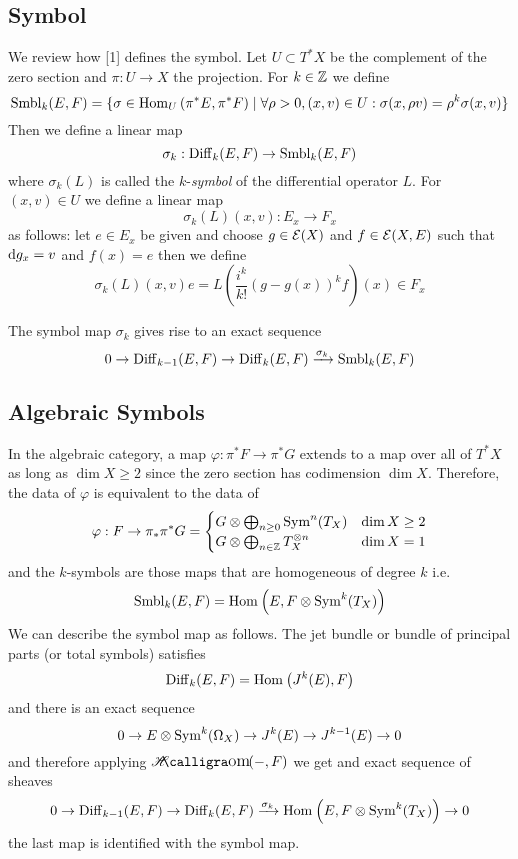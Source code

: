 \documentclass[12pt]{article}
\begin{document}
\subsection{Symbol}

\newcommand{\Smbl}{\mathrm{Smbl}}

We review how [1] defines the symbol. Let $U \subset T^* X$ be the complement of the zero section and $\pi : U \to X$ the projection. For $k \in \mathbb{Z}$ we define
\[ \Smbl_k(E, F) = \{ \sigma \in \Hom{U}{\pi^* E}{\pi^* F} \mid \forall \rho > 0, (x,v) \in U : \sigma(x, \rho v) = \rho^k \sigma(x,v) \} \]
Then we define a linear map
\[ \sigma_k : \Diff_k(E, F) \to \Smbl_k(E, F) \]
where $\sigma_k(L)$ is called the $k$-\textit{symbol} of the differential operator $L$. For $(x,v) \in U$ we define a linear map
\[ \sigma_k(L)(x,v) : E_x \to F_x \]
as follows: let $e \in E_x$ be given and choose $g \in \mathcal{E}(X)$ and $f \in \mathcal{E}(X,E)$ such that $\mathrm{d}{g}_x = v$ and $f(x) = e$ then we define
\[ \sigma_k(L)(x,v) e = L \left( \frac{i^k}{k!} (g - g(x))^k f \right)(x) \in F_x \]

\begin{prop}
The symbol map $\sigma_k$ gives rise to an exact sequence
\[ 0 \to \Diff_{k-1}(E, F) \to \Diff_k(E, F) \xrightarrow{\sigma_k} \Smbl_k(E, F) \]
\end{prop}

\subsection{Algebraic Symbols}

In the algebraic category, a map $\varphi : \pi^* F \to \pi^* G$ extends to a map over all of $T^* X$ as long as $\dim{X} \ge 2$ since the zero section has codimension $\dim{X}$. Therefore, the data of $\varphi$ is equivalent to the data of 
\[ \varphi : F \to \pi_* \pi^* G = 
\begin{cases}
G \otimes \bigoplus_{n \ge 0} \mathrm{Sym}^{n}\! \left( T_X \right) & \dim{X} \ge 2
\\
G \otimes \bigoplus_{n \in \mathbb{Z}} T_X^{\otimes n} & \dim{X} = 1
\end{cases} \]
and the $k$-symbols are those maps that are homogeneous of degree $k$ i.e.
\[ \Smbl_k(E, F) = \Hom{}{E}{F \ot \nSym{k}{T_X}} \]
We can describe the symbol map as follows. The jet bundle or bundle of principal parts (or total symbols) satisfies
\[ \mathrm{Diff}_k(E, F) = \mathrm{Hom}_{} \left( J^k(E), F \right) \]
and there is an exact sequence
\[ 0 \to E \otimes \mathrm{Sym}^{k}\! \left( \Omega_X \right) \to J^k(E) \to J^{k-1}(E) \to 0 \]
and therefore applying $\shHom{}{-}{F}$ we get and exact sequence of sheaves
\[ 0 \to \mathrm{Diff}_{k-1}(E, F) \to \mathrm{Diff}_k(E, F) \xrightarrow{\sigma_k} \mathrm{Hom}_{} \left( E, F \otimes \mathrm{Sym}^{k}\! \left( T_X \right) \right) \to 0 \]
the last map is identified with the symbol map. 
\end{document}
